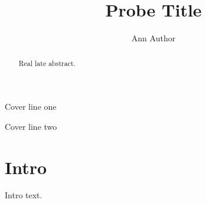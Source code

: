 \documentclass{article}
\title{Probe Title}\author{Ann Author}
\begin{document}
\maketitle
\begin{center}Cover line one\end{center}
\begin{abstract}
\end{abstract}
\begin{center}Cover line two\end{center}
\begin{abstract}Real late abstract.\end{abstract}
\section{Intro}
Intro text.
\end{document}
